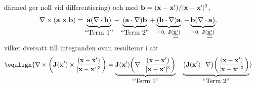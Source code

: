 {d{\"a}rmed ger noll vid differentiering) och med
${\bf b}=({\bf x}-{\bf x}')/|{\bf x}-{\bf x}'|^3$,
$$
  \nabla\times({\bf a}\times{\bf b})
    =\underbrace{{\bf a}(\nabla\cdot{\bf b})}_{\hbox{``Term 1''}}
      -\underbrace{({\bf a}\cdot\nabla){\bf b}}_{\hbox{``Term 2''}}
      +\underbrace{({\bf b}\cdot\nabla){\bf a}}_{
         =0,\ {\bf J}(\underline{\underline{\underline{{\bf x}'}}})},
      -\underbrace{{\bf b}(\nabla\cdot{\bf a})}_{
         =0,\ {\bf J}(\underline{\underline{\underline{{\bf x}'}}})},
$$
vilket {\"o}versatt till integranden ovan resulterar i att
$$
  \eqalign{
    \nabla\times
        \bigg(
        {\bf J}({\bf x}')\times
          {{({\bf x}-{\bf x}')}\over{|{\bf x}-{\bf x}'|^3}}
        \bigg)
        =\underbrace{
        {\bf J}({\bf x}')
        \bigg(
        \nabla\cdot
          {{({\bf x}-{\bf x}')}\over{|{\bf x}-{\bf x}'|^3}}
        \bigg)
        }_{\hbox{``Term 1''}}
        -\underbrace{
        \big({\bf J}({\bf x}')\cdot\nabla\big)
        \bigg(
          {{({\bf x}-{\bf x}')}\over{|{\bf x}-{\bf x}'|^3}}
        \bigg)
        }_{\hbox{``Term 2''}}
  }
$$
\vfill\eject

}
